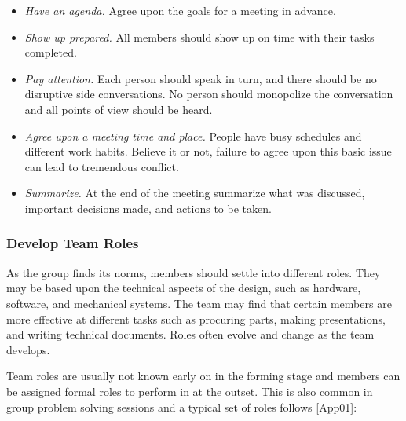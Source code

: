\begin{itemize}
\item
  \emph{Have an agenda.} Agree upon the goals for a meeting in advance.
\item
  \emph{Show up prepared.} All members should show up on time with their
  tasks completed.
\item
  \emph{Pay attention.} Each person should speak in turn, and there
  should be no disruptive side conversations. No person should
  monopolize the conversation and all points of view should be heard.
\item
  \emph{Agree upon a meeting time and place.} People have busy schedules
  and different work habits. Believe it or not, failure to agree upon
  this basic issue can lead to tremendous conflict.
\item
  \emph{Summarize.} At the end of the meeting summarize what was
  discussed, important decisions made, and actions to be taken.
\end{itemize}

\subsubsection{Develop Team Roles}\label{develop-team-roles}

As the group finds its norms, members should settle into different
roles. They may be based upon the technical aspects of the design, such
as hardware, software, and mechanical systems. The team may find that
certain members are more effective at different tasks such as procuring
parts, making presentations, and writing technical documents. Roles
often evolve and change as the team develops.

Team roles are usually not known early on in the forming stage and
members can be assigned formal roles to perform in at the outset. This
is also common in group problem solving sessions and a typical set of
roles follows {[}App01{]}:

